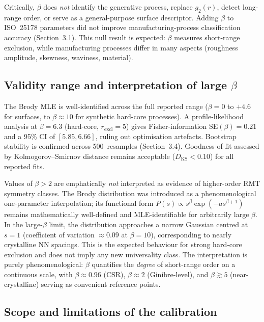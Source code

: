 \documentclass[final,1p,times]{elsarticle}
\theoremstyle{definition}
\begin{document}
Critically, $\beta$ does \emph{not} identify the generative process,
replace $g_2(r)$, detect long-range order, or serve as a
general-purpose surface descriptor. Adding $\beta$ to ISO~25178
parameters did not improve manufacturing-process classification
accuracy (Section~3.1). This null result is expected: $\beta$ measures
short-range exclusion, while manufacturing processes differ in many
aspects (roughness amplitude, skewness, waviness, material).

\subsection{Validity range and interpretation of large $\beta$}

The Brody MLE is well-identified across the full reported range
($\beta=0$ to $+4.6$ for surfaces, to $\beta\approx10$ for synthetic
hard-core processes). A profile-likelihood analysis at $\beta=6.3$
(hard-core, $r_{\text{excl}}=5$) gives Fisher-information
SE$(\beta)=0.21$ and a 95\% CI of $[5.85,6.66]$, ruling out
optimisation artefacts. Bootstrap stability is confirmed across
500~resamples (Section~3.4). Goodness-of-fit assessed by
Kolmogorov--Smirnov distance remains acceptable
($D_{\text{KS}}<0.10$) for all reported fits.

Values of $\beta>2$ are emphatically \emph{not} interpreted as
evidence of higher-order RMT symmetry classes. The Brody distribution
was introduced as a phenomenological one-parameter interpolation; its
functional form $P(s)\propto s^\beta\exp(-as^{\beta+1})$ remains
mathematically well-defined and MLE-identifiable for arbitrarily large
$\beta$. In the large-$\beta$ limit, the distribution approaches a
narrow Gaussian centred at $s=1$ (coefficient of variation
$\approx0.09$ at $\beta=10$), corresponding to nearly crystalline NN
spacings. This is the expected behaviour for strong hard-core exclusion
and does not imply any new universality class. The interpretation is
purely phenomenological: $\beta$ quantifies the \emph{degree} of
short-range order on a continuous scale, with $\beta\approx0.96$
(CSR), $\beta\approx2$ (Ginibre-level), and $\beta\gtrsim5$
(near-crystalline) serving as convenient reference points.

\subsection{Scope and limitations of the calibration}
\end{document}
